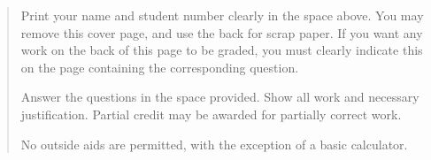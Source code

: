 \documentclass[12pt]{article}
\begin{document}
\vspace{0.1in}

\vspace*{\fill}

\begin{quote}
Print your name and student number clearly in the space above. You may remove this cover page, and use the back for scrap paper. If you want any work on the back of this page to be graded, you must clearly indicate this on the page containing the corresponding question.

\medskip

Answer the questions in the space provided. Show all work and necessary justification. Partial credit may be awarded for partially correct work.
 
\medskip

No outside aids are permitted, with the exception of a basic calculator. 
\end{quote}





\newpage
\end{document}
